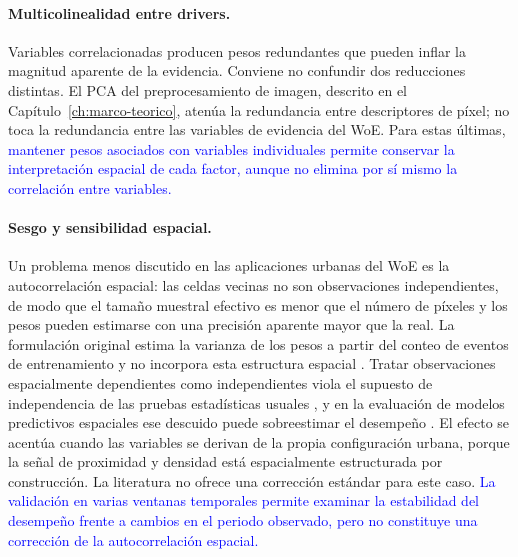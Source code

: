
\paragraph{Multicolinealidad entre drivers.} Variables correlacionadas producen
pesos redundantes que pueden inflar la magnitud aparente de la evidencia.
Conviene no confundir dos reducciones distintas. El PCA del preprocesamiento
de imagen, descrito en el Capítulo~\ref{ch:marco-teorico}, atenúa la
redundancia entre descriptores de píxel; no toca la redundancia entre las
variables de evidencia del WoE. Para estas últimas,
\textcolor{blue}{mantener pesos asociados con variables individuales permite
conservar la interpretación espacial de cada factor, aunque no elimina por sí
mismo la correlación entre variables.}

\paragraph{Sesgo y sensibilidad espacial.} Un problema menos discutido en las
aplicaciones urbanas del WoE es la autocorrelación espacial: las celdas vecinas
no son observaciones independientes, de modo que el tamaño muestral efectivo
es menor que el número de píxeles y los pesos pueden estimarse con una
precisión aparente mayor que la real. La formulación original estima la
varianza de los pesos a partir del conteo de eventos de entrenamiento y no
incorpora esta estructura espacial \parencite{BonhamCarter1994}. Tratar
observaciones espacialmente dependientes como independientes viola el supuesto
de independencia de las pruebas estadísticas usuales
\parencite{Legendre1993}, y en la evaluación de modelos predictivos espaciales
ese descuido puede sobreestimar el desempeño \parencite{Brenning2012}. El
efecto se acentúa cuando las variables se derivan de la propia configuración
urbana, porque la señal de proximidad y densidad está espacialmente estructurada
por construcción. La literatura no ofrece una corrección estándar para este
caso. \textcolor{blue}{La validación en varias ventanas temporales permite
examinar la estabilidad del desempeño frente a cambios en el periodo
observado, pero no constituye una corrección de la autocorrelación espacial.}

%


